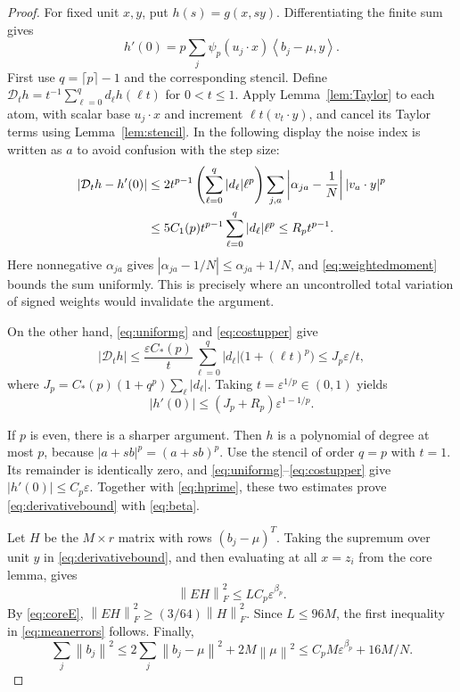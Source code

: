 \documentclass[11pt,letterpaper]{article}
\theoremstyle{definition}
\theoremstyle{remark}
\numberwithin{equation}{section}
\newcommand{\eps}{\varepsilon}
\newcommand{\norm}[1]{\left\lVert#1\right\rVert}
\newcommand{\ip}[2]{\left\langle#1,#2\right\rangle}
\begin{document}
\begin{proof}
For fixed unit $x,y$, put $h(s)=g(x,sy)$. Differentiating the finite sum gives
\begin{equation}\label{eq:hprime}
 h'(0)=p\sum_j\psi_p(u_j\cdot x)\ip{b_j-\mu}{y}.
\end{equation}
First use $q=\lceil p\rceil-1$ and the corresponding stencil. Define
$\mathcal D_th=t^{-1}\sum_{\ell=0}^qd_\ell h(\ell t)$ for $0<t\le1$.
Apply Lemma~\ref{lem:Taylor} to each atom, with scalar base $u_j\cdot x$ and increment $\ell t(v_t\cdot y)$, and cancel its Taylor terms using Lemma~\ref{lem:stencil}. In the following display the noise index is written as $a$ to avoid confusion with the step size:
\begin{align}
 |\mathcal D_th-h'(0)|
 &\le2t^{p-1}\left(\sum_{\ell=0}^q|d_\ell|\ell^p\right)
 \sum_{j,a}\left|\alpha_{ja}-\frac1N\right||v_a\cdot y|^p\notag\\
 &\le5C_1(p)t^{p-1}\sum_{\ell=0}^q|d_\ell|\ell^p
 \le R_p t^{p-1}.\label{eq:FDremainder}
\end{align}
Here nonnegative $\alpha_{ja}$ gives $|\alpha_{ja}-1/N|\le\alpha_{ja}+1/N$, and \eqref{eq:weightedmoment} bounds the sum uniformly. This is precisely where an uncontrolled total variation of signed weights would invalidate the argument.

On the other hand, \eqref{eq:uniformg} and \eqref{eq:costupper} give
\begin{equation}\label{eq:FDnoise}
 |\mathcal D_th|\le\frac{\eps C_*(p)}t
 \sum_{\ell=0}^q|d_\ell|\bigl(1+(\ell t)^p\bigr)
 \le J_p\eps/t,
\end{equation}
where $J_p=C_*(p)(1+q^p)\sum_\ell|d_\ell|$. Taking $t=\eps^{1/p}\in(0,1)$ yields
\begin{equation}\label{eq:nonintegerderivative}
 |h'(0)|\le(J_p+R_p)\eps^{1-1/p}.
\end{equation}

If $p$ is even, there is a sharper argument. Then $h$ is a polynomial of degree at most $p$, because $|a+sb|^p=(a+sb)^p$. Use the stencil of order $q=p$ with $t=1$. Its remainder is identically zero, and \eqref{eq:uniformg}--\eqref{eq:costupper} give $|h'(0)|\le C_p\eps$. Together with \eqref{eq:hprime}, these two estimates prove \eqref{eq:derivativebound} with \eqref{eq:beta}.

Let $H$ be the $M\times r$ matrix with rows $(b_j-\mu)^T$. Taking the supremum over unit $y$ in \eqref{eq:derivativebound}, and then evaluating at all $x=z_i$ from the core lemma, gives
\[
 \norm{EH}_F^2\le LC_p\eps^{\beta_p}.
\]
By \eqref{eq:coreE}, $\norm{EH}_F^2\ge(3/64)\norm{H}_F^2$. Since $L\le96M$, the first inequality in \eqref{eq:meanerrors} follows. Finally,
\[
 \sum_j\norm{b_j}^2\le2\sum_j\norm{b_j-\mu}^2+2M\norm{\mu}^2
 \le C_pM\eps^{\beta_p}+16M/N.
\]
\end{proof}
\end{document}
